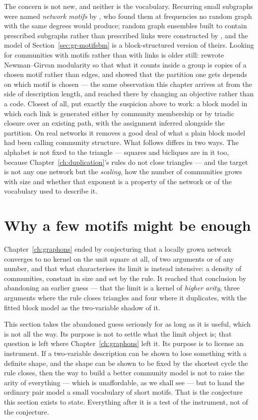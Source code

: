 The concern is not new, and neither is the vocabulary. Recurring small subgraphs
were named \emph{network motifs} by \citet{milo2002}, who found them at
frequencies no random graph with the same degrees would produce; random graph
ensembles built to contain prescribed subgraphs rather than prescribed links were
constructed by \citet{karrer2010subgraphs}, and the model of
Section~\ref{sec:gr-motifsbm} is a block-structured version of theirs. Looking for
communities with motifs rather than with links is older still:
\citet{arenas2008motif} rewrote Newman--Girvan modularity so that what it counts
inside a group is copies of a chosen motif rather than edges, and showed that the
partition one gets depends on which motif is chosen --- the same observation this
chapter arrives at from the side of description length, and reached there by
changing an objective rather than a code. Closest of
all, \citet{peixoto2022triadic} put exactly the suspicion above to work: a block
model in which each link is generated either by community membership or by
triadic closure over an existing path, with the assignment inferred alongside the
partition. On real networks it removes a good deal of what a plain block model
had been calling community structure. What follows differs in two ways. The
alphabet is not fixed to the triangle --- squares and bicliques are in it too,
because Chapter~\ref{ch:duplication}'s rules do not close triangles --- and the
target is not any one network but the \emph{scaling}, how the number of
communities grows with size and whether that exponent is a property of the
network or of the vocabulary used to describe it.

\section{Why a few motifs might be enough}
\label{sec:gr-conjecture}

Chapter~\ref{ch:graphons} ended by conjecturing that a locally grown network
converges to no kernel on the unit square at all, of two arguments or of any
number, and that what characterises its limit is instead intensive: a density of
communities, constant in size and set by the rule. It reached that conclusion by
abandoning an earlier guess --- that the limit is a kernel of \emph{higher
arity}, three arguments where the rule closes triangles and four where it
duplicates, with the fitted block model as the two-variable shadow of it.

This section takes the abandoned guess seriously for as long as it is useful,
which is not all the way. Its purpose is not to settle what the limit object is;
that question is left where Chapter~\ref{ch:graphons} left it. Its purpose is to
license an instrument. If a two-variable description can be shown to lose
something with a definite shape, and the shape can be shown to be fixed by the
shortest cycle the rule closes, then the way to build a better community model is
not to raise the arity of everything --- which is unaffordable, as we shall see
--- but to hand the ordinary pair model a small vocabulary of short motifs. That
is the conjecture this section exists to state. Everything after it is a test of
the instrument, not of the conjecture.

